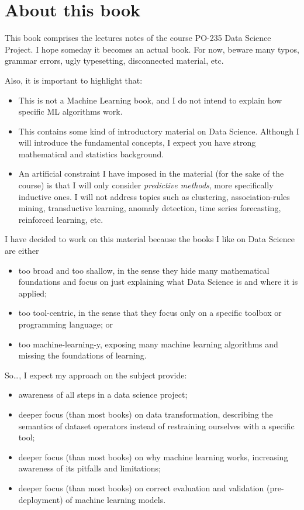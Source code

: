 \chapter*{About this book}

This book comprises the lectures notes of the course PO-235 Data Science Project.
I hope someday it becomes an actual book. For now, beware many typos, grammar errors, ugly
typesetting, disconnected material, etc.

Also, it is important to highlight that:
\begin{itemize}
  \item This is not a Machine Learning book, and I do not intend to explain how specific
    ML algorithms work.
  \item This contains some kind of introductory material on Data Science.  Although I will
    introduce the fundamental concepts, I expect you have strong mathematical and
    statistics background.
  \item An artificial constraint I have imposed in the material (for the sake of the
    course) is that I will only consider \emph{predictive methods}, more specifically
    inductive ones. I will not address topics such as clustering, association-rules
    mining, transductive learning, anomaly detection, time series forecasting, reinforced
    learning, etc.
\end{itemize}

I have decided to work on this material because the books I like on Data Science are
either
\begin{itemize}
  \item too broad and too shallow, in the sense they hide many mathematical foundations
    and focus on just explaining what Data Science is and where it is applied;
  \item too tool-centric, in the sense that they focus only on a specific toolbox or
    programming language; or
  \item too machine-learning-y, exposing many machine learning algorithms and missing the
    foundations of learning.
\end{itemize}

So\dots, I expect my approach on the subject provide:
\begin{itemize}
  \item awareness of all steps in a data science project;
  \item deeper focus (than most books) on data transformation, describing the semantics of dataset
    operators instead of restraining ourselves with a specific tool;
  \item deeper focus (than most books) on why machine learning works, increasing awareness of its pitfalls and
    limitations;
  \item deeper focus (than most books) on correct evaluation and validation
    (pre-deployment) of machine learning models.
\end{itemize}

